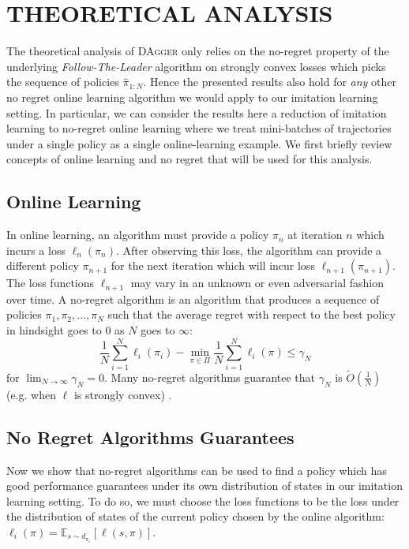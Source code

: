 \documentclass[twoside]{article}
\begin{document}
\section{THEORETICAL ANALYSIS}
%
The theoretical analysis of \textsc{DAgger} only relies on the no-regret property of the underlying \emph{Follow-The-Leader} algorithm on strongly convex losses \citep{Kakade09} which picks the sequence of policies $\hat{\pi}_{1:N}$. Hence the presented results also hold for \emph{any} other no regret online learning algorithm we would apply to our imitation learning setting. In particular, we can consider the results here a reduction of imitation learning to no-regret online learning where we treat mini-batches of trajectories under a single policy as a single online-learning example. We first briefly review concepts of online learning and no regret that will be used for this analysis.
%
\subsection{Online Learning}
%
In online learning, an algorithm must provide a policy $\pi_n$ at iteration $n$ which incurs a loss $\ell_n(\pi_n)$. After observing this loss, the algorithm can provide a different policy $\pi_{n+1}$ for the next iteration which will incur loss $\ell_{n+1}(\pi_{n+1})$. The loss functions $\ell_{n+1}$ may vary in an unknown or even adversarial fashion over time. A no-regret algorithm is an algorithm that produces a sequence of policies $\pi_1, \pi_2, \dots, \pi_N$ such that the average regret with respect to the best policy in hindsight goes to 0 as $N$ goes to $\infty$:
%
\begin{equation}
\frac{1}{N} \sum_{i=1}^N \ell_i(\pi_i) - \min_{\pi \in \Pi} \frac{1}{N} \sum_{i=1}^N \ell_i(\pi) \leq \gamma_N
\end{equation}
%
for $\lim_{N \rightarrow \infty} \gamma_N = 0$. Many no-regret algorithms guarantee that $\gamma_N$ is $\tilde{O}(\frac{1}{N})$ (e.g. when $\ell$ is strongly convex) \citep{Hazan06, Kakade08, Kakade09}.
%
\subsection{No Regret Algorithms Guarantees}
%
Now we show that no-regret algorithms can be used to find a policy which has good performance guarantees under its own distribution of states in our imitation learning setting. To do so, we must choose the loss functions to be the loss under the distribution of states of the current policy chosen by the online algorithm: $\ell_i(\pi) = \mathbb{E}_{s \sim d_{\pi_i}}[\ell(s,\pi)]$.
\end{document}
